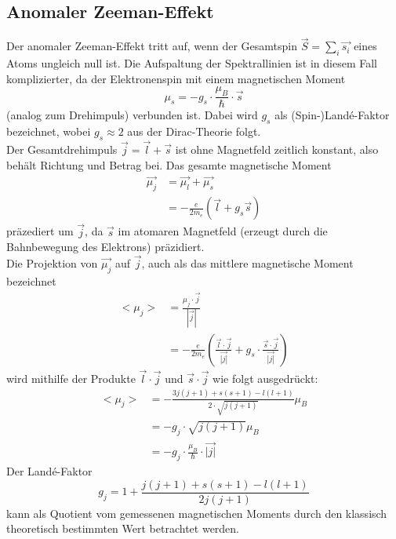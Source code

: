 \subsection{Anomaler Zeeman-Effekt}
Der anomaler Zeeman-Effekt tritt auf, wenn der Gesamtspin $\vec{S} = \sum_i \vec{s_i}$ eines Atoms ungleich null ist.
Die Aufspaltung der Spektrallinien ist in diesem Fall komplizierter, da der Elektronenspin mit einem magnetischen Moment
\begin{equation*}
    \mu_s = -g_s \cdot \frac{\mu_B}{\hbar} \cdot \vec{s}
    \label{eqn:lande_s}
\end{equation*}
(analog zum Drehimpuls) verbunden ist.
Dabei wird $g_s$ als (Spin-)Landé-Faktor bezeichnet, wobei $g_s \approx 2$ aus der Dirac-Theorie folgt.
\\
Der Gesamtdrehimpuls $\vec{j} = \vec{l} + \vec{s}$ ist ohne Magnetfeld zeitlich konstant, also behält Richtung und Betrag bei.
Das gesamte magnetische Moment
\begin{align*}
    \vec{\mu_j} &= \vec{\mu_l} + \vec{\mu_s} \\
    &= - \frac{e}{2m_e}(\vec{l} + g_s \vec{s})
\end{align*}
präzediert um $\vec{j}$, da $\vec{s}$ im atomaren Magnetfeld (erzeugt durch die Bahnbewegung des Elektrons) präzidiert.
\\
Die Projektion von $\vec{\mu_j}$ auf $\vec{j}$, auch als das mittlere magnetische Moment bezeichnet
\begin{align*}
    <\mu_j> &= \frac{\mu_j \cdot \vec{j}}{|\vec{j}|}\\
    &= -\frac{e}{2m_e} \left ( \frac{\vec{l} \cdot \vec{j}}{\vec{|j|}} + g_s \cdot \frac{\vec{s} \cdot \vec{j}}{\vec{|j|}} \right )
\end{align*}
wird mithilfe der Produkte $\vec{l} \cdot \vec{j}$ und $\vec{s} \cdot \vec{j}$ wie folgt ausgedrückt:
\begin{align*}
    <\mu_j> &= - \frac{3j(j+1) + s(s+1) - l(l+1)}{2 \cdot \sqrt{j(j+1)}} \mu_B \\
    &= - g_j \cdot \sqrt{j(j+1)} \mu_B \\
    &= - g_j \cdot \frac{\mu_B}{\hbar} \cdot \vec{|j|}
\end{align*}
Der Landé-Faktor
\begin{equation}
    g_j = 1 + \frac{j(j+1) + s(s+1) - l(l+1)}{2j(j+1)}
    \label{eqn:lande}
\end{equation}
kann als Quotient vom gemessenen magnetischen Moments durch den klassisch theoretisch bestimmten Wert betrachtet werden.
